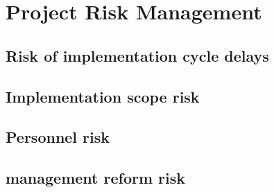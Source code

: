 \chapter{Project Risk Management}

\section{Risk of implementation cycle delays}

\section{Implementation scope risk}

\section{Personnel risk}

\section{management reform risk}